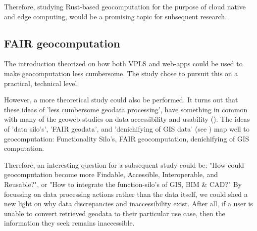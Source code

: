 Therefore, studying Rust-based geocomputation for the purpose of cloud native and edge computing, would be a promising topic for subsequent research. 

\subsection{FAIR geocomputation}
The introduction theorized on how both VPLS and web-apps could be used to make geocomputation less cumbersome.
The study chose to pursuit this on a practical, technical level. 

However, a more theoretical study could also be performed. 
It turns out that these ideas of 'less cumbersome geodata processing', have something in common with many of the geoweb studies on data accessibility and usability (\cite{brink_geospatial_2018}).
The ideas of 'data silo's', 'FAIR geodata', and 'denichifying of \ac{GIS} data' (see \cite{brink_geospatial_2018}) map well to geocomputation:
Functionality Silo's, FAIR geocomputation, denichifying of \ac{GIS} computation. 

Therefore, an interesting question for a subsequent study could be: "How could geocomputation become more Findable, Accessible, Interoperable, and Reusable?", or "How to integrate the function-silo's of GIS, BIM \& CAD?"
By focussing on data processing actions rather than the data itself, we could shed a new light on why data discrepancies and inaccessibility exist. 
After all, if a user is unable to convert retrieved geodata to their particular use case, then the information they seek remains inaccessible.







  

